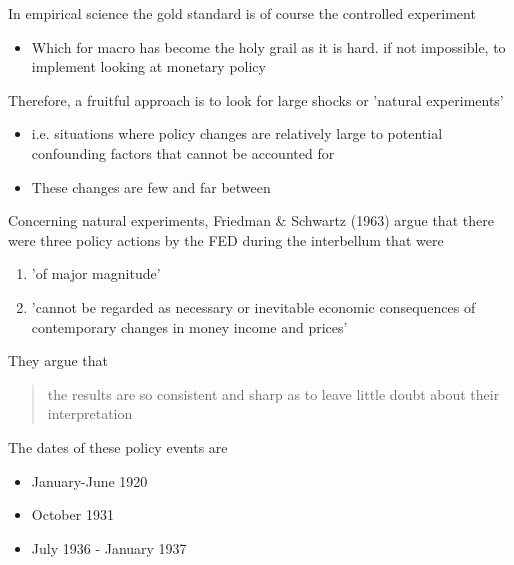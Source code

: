\documentclass{beamer}
\begin{document}
\begin{frame}
 In empirical science the gold standard is of course the controlled experiment
 \medskip  
  \begin{itemize}
    \item Which for macro has become the holy grail as it is hard. if not impossible, to implement looking at monetary policy
  \end{itemize}
  \medskip
  Therefore, a fruitful approach is to look for large shocks or 'natural experiments'
  \begin{itemize}
    \item i.e. situations where policy changes are relatively large to potential confounding factors that cannot be accounted for
    \item These changes are few and far between 
  \end{itemize}
\end{frame}

\begin{frame}
  Concerning natural experiments, Friedman \& Schwartz (1963) argue that there were three policy actions by the FED during the interbellum that were  
  \begin{enumerate}
    \item 'of major magnitude'
    \item 'cannot be regarded as necessary or inevitable economic consequences of contemporary changes in money income and prices'
  \end{enumerate}
  \medskip
  They argue that 
  \begin{quote}
    the results are so consistent and sharp as to leave little doubt about their interpretation
  \end{quote}
  \medskip
  The dates of these policy events are   
  \begin{itemize}
    \item January-June 1920
    \item October 1931
    \item July 1936 - January 1937
  \end{itemize}
\end{frame}
\end{document}

